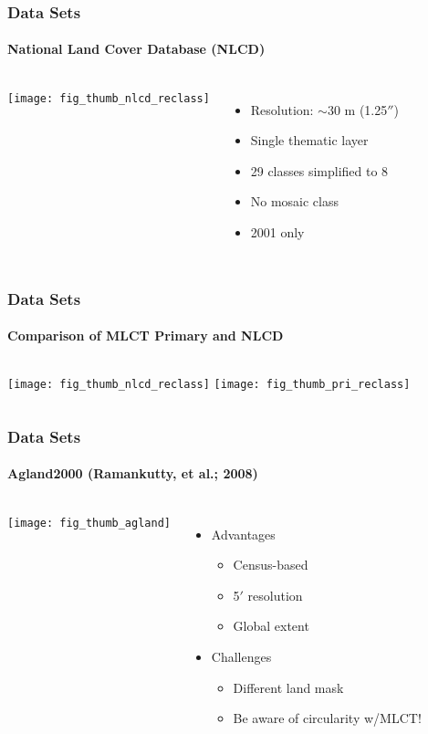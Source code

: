 \documentclass{beamer}
\begin{document}

\begin{frame}
  \frametitle{Data Sets}
  \framesubtitle{National Land Cover Database (NLCD)}
  \begin{columns}
    \column{2.5in}
    \texttt{[image: fig\_thumb\_nlcd\_reclass]}    
    \column{2.5in}
    \begin{itemize}
      \pause
    \item Resolution: $\sim$30 m (1.25$''$)
      \pause
    \item Single thematic layer
      \pause
    \item 29 classes simplified to 8
      \pause
    \item No mosaic class
      \pause
    \item 2001 only
    \end{itemize}
  \end{columns}
\end{frame}

\begin{frame}
  \frametitle{Data Sets}
  \framesubtitle{Comparison of MLCT Primary and NLCD}
  \begin{columns}
    \column{2.5in}
    \texttt{[image: fig\_thumb\_nlcd\_reclass]}    
    \column{2.5in}
    \texttt{[image: fig\_thumb\_pri\_reclass]}    
  \end{columns}
\end{frame}

\begin{frame}
  \frametitle{Data Sets}
  \framesubtitle{Agland2000 (Ramankutty, et al.; 2008)}
  \begin{columns}
    \column{2.5in}
    \texttt{[image: fig\_thumb\_agland]}    
    \column{2.5in}
    \begin{itemize}
    \item Advantages
      \begin{itemize}
        \pause
      \item Census-based
        \pause
      \item 5$'$ resolution
        \pause
      \item Global extent
      \end{itemize}
      \pause
    \item Challenges
      \begin{itemize}
        \pause
      \item Different land mask
        \pause
      \item Be aware of circularity w\slash{}MLCT!
      \end{itemize}
    \end{itemize}
  \end{columns}
\end{frame}
\end{document}
